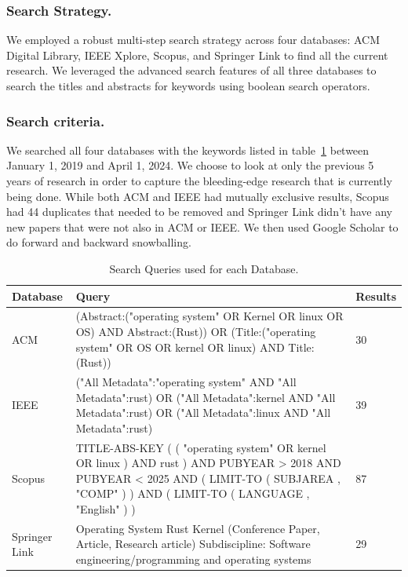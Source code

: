 \documentclass[sigconf]{acmart}
\begin{document}
\subsubsection{\textbf{Search Strategy.}}

We employed a robust multi-step search strategy across four databases: ACM Digital Library,
IEEE Xplore, Scopus, and Springer Link to find all the current research. 
We leveraged the advanced search features of all three databases to search the titles and abstracts for
keywords using boolean search operators.


\subsubsection{\textbf{Search criteria.}}

We searched all four databases with the keywords listed in table~\ref{tab:keywords} between January
1, 2019 and April 1, 2024. We choose to look at only the previous 5 years of research in order to capture the
bleeding-edge research that is currently being done. While both ACM and IEEE had mutually exclusive results, Scopus had 44
duplicates that needed to be removed and Springer Link didn't have any new papers that were not also in ACM or IEEE. We then used Google Scholar to do forward and backward snowballing. 

\begin{table}
\begin{tabular}{|| p{2cm}| p{4cm} | p{1cm} ||}
 \hline
 Database & Query & Results \\
 \hline\hline
 ACM  & (Abstract:("operating system" OR Kernel OR linux OR OS) AND Abstract:(Rust)) OR (Title:("operating system" OR OS OR kernel OR linux) AND Title:(Rust))  & 30 \\
 IEEE & ("All Metadata":"operating system" AND "All Metadata":rust) OR ("All Metadata":kernel AND
 "All Metadata":rust) OR ("All Metadata":linux AND "All Metadata":rust) & 39 \\
 Scopus & TITLE-ABS-KEY ( ( "operating system" OR kernel OR linux ) AND rust ) AND PUBYEAR > 2018
 AND PUBYEAR < 2025 AND ( LIMIT-TO ( SUBJAREA , "COMP" ) ) AND ( LIMIT-TO ( LANGUAGE , "English" ) )
 & 87 \\
 Springer Link & Operating System Rust Kernel (Conference Paper, Article, Research article) Subdiscipline: Software engineering/programming and operating systems & 29 \\
 \hline
\end{tabular}
\caption{Search Queries used for each Database.}
\label{tab:keywords}
\end{table}
\end{document}
